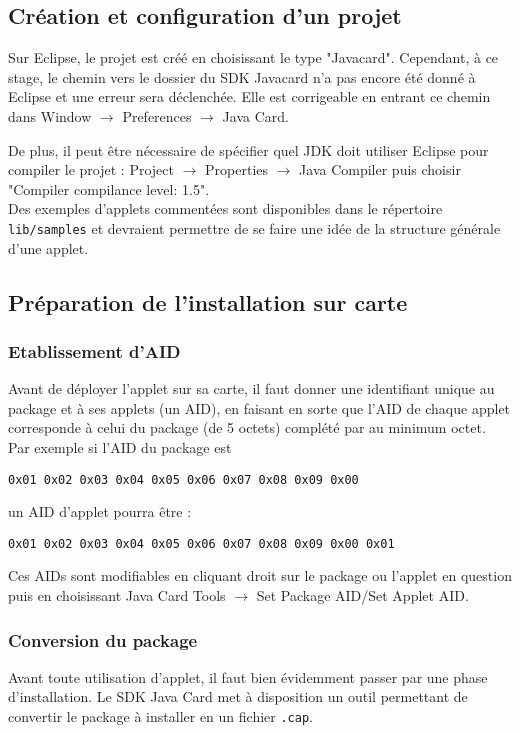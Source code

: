 \documentclass[a4paper,11pt,french]{article}
\begin{document}
\subsection{Création et configuration d'un projet}
Sur Eclipse, le projet est créé en choisissant le type "Javacard". Cependant,
à ce stage, le chemin vers le dossier du SDK Javacard n'a pas encore été donné
à Eclipse et une erreur sera déclenchée. Elle est corrigeable en entrant ce chemin
dans Window $\rightarrow$ Preferences $\rightarrow$ Java Card.

De plus, il peut être nécessaire de spécifier quel JDK doit utiliser Eclipse
pour compiler le projet : Project $\rightarrow$ Properties $\rightarrow$ Java 
Compiler puis choisir "Compiler compilance level: 1.5".\\

Des exemples d'applets commentées sont disponibles dans le répertoire \texttt{lib/samples}
et devraient permettre de se faire une idée de la structure générale d'une 
applet.\\

\subsection{Préparation de l'installation sur carte}
\subsubsection{Etablissement d'AID}
Avant de déployer l'applet sur sa carte, il faut donner une identifiant unique
au package et à ses applets (un AID), en faisant en sorte que l'AID de chaque applet
corresponde à celui du package (de 5 octets) complété par au minimum octet. 
Par exemple si l'AID du package est 
\begin{verbatim}
0x01 0x02 0x03 0x04 0x05 0x06 0x07 0x08 0x09 0x00
\end{verbatim}
un AID d'applet pourra être :
\begin{verbatim}
0x01 0x02 0x03 0x04 0x05 0x06 0x07 0x08 0x09 0x00 0x01
\end{verbatim}
Ces AIDs sont modifiables en cliquant droit sur le package ou l'applet en question
puis en choisissant Java Card Tools $\rightarrow$ Set Package AID/Set Applet AID. \\

\subsubsection{Conversion du package}
Avant toute utilisation d'applet, il faut bien évidemment passer par une phase
d'installation. Le SDK Java Card met à disposition un outil permettant de convertir
le package à installer en un fichier \texttt{.cap}.
\end{document}
